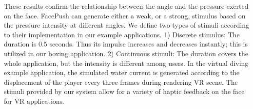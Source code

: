 These results confirm the relationship between the angle and the pressure exerted on the face. FacePush can generate either a weak, or a strong, stimulus based on the pressure intensity at different angles. We define two types of stimuli according to their implementation in our example applications. 1) Discrete stimulus: The duration is 0.5 seconds. Thus its impulse increases and decreases instantly; this is utilized in our boxing application. 2) Continuous stimuli: The duration covers the whole application, but the intensity is different among users. In the virtual diving example application, the simulated water current is generated according to the displacement of the player every three frames during rendering VR scene. The stimuli provided by our system allow for a variety of haptic feedback on the face for VR applications. 

